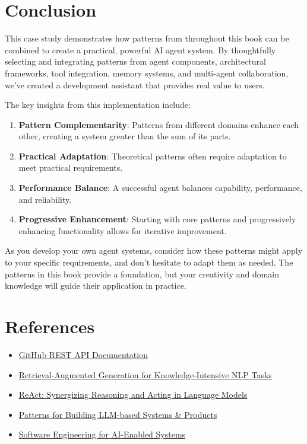 \documentclass[11pt,oneside]{book}
\providecommand{\tightlist}{%
  \setlength{\itemsep}{0pt}\setlength{\parskip}{0pt}}
\begin{document}
\section{Conclusion}\label{conclusion-2}

This case study demonstrates how patterns from throughout this book can
be combined to create a practical, powerful AI agent system. By
thoughtfully selecting and integrating patterns from agent components,
architectural frameworks, tool integration, memory systems, and
multi-agent collaboration, we've created a development assistant that
provides real value to users.

The key insights from this implementation include:

\begin{enumerate}
\def\labelenumi{\arabic{enumi}.}
\item
  \textbf{Pattern Complementarity}: Patterns from different domains
  enhance each other, creating a system greater than the sum of its
  parts.
\item
  \textbf{Practical Adaptation}: Theoretical patterns often require
  adaptation to meet practical requirements.
\item
  \textbf{Performance Balance}: A successful agent balances capability,
  performance, and reliability.
\item
  \textbf{Progressive Enhancement}: Starting with core patterns and
  progressively enhancing functionality allows for iterative
  improvement.
\end{enumerate}

As you develop your own agent systems, consider how these patterns might
apply to your specific requirements, and don't hesitate to adapt them as
needed. The patterns in this book provide a foundation, but your
creativity and domain knowledge will guide their application in
practice.

\section{References}\label{references-3}

\begin{itemize}
\tightlist
\item
  \href{https://docs.github.com/en/rest}{GitHub REST API Documentation}
\item
  \href{https://arxiv.org/abs/2005.11401}{Retrieval-Augmented Generation
  for Knowledge-Intensive NLP Tasks}
\item
  \href{https://arxiv.org/abs/2210.03629}{ReAct: Synergizing Reasoning
  and Acting in Language Models}
\item
  \href{https://eugeneyan.com/writing/llm-patterns/}{Patterns for
  Building LLM-based Systems \& Products}
\item
  \href{https://cmu-seai.github.io/}{Software Engineering for AI-Enabled
  Systems}
\end{itemize}
\end{document}
